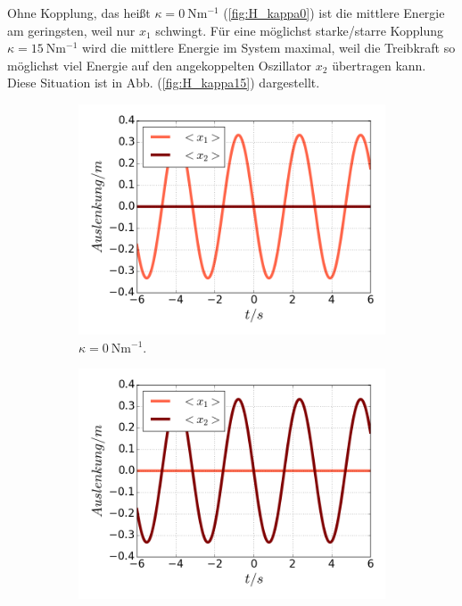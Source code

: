 \fi
    Ohne Kopplung, das heißt $\kappa=\SI{0}{\newton \meter^{-1}}$ (\ref{fig:H_kappa0}) ist die mittlere Energie am geringsten, weil nur $x_1$ schwingt.
    Für eine möglichst starke/starre Kopplung $\kappa=\SI{15}{\newton \meter^{-1}}$ wird die mittlere Energie im System maximal, weil die Treibkraft so möglichst viel Energie auf den angekoppelten Oszillator $x_2$ übertragen kann.
    Diese Situation ist in Abb. (\ref{fig:H_kappa15}) dargestellt.
    \begin{figure}
      \begin{subfigure}[t]{0.5\textwidth}
        \centering
        \includegraphics[width=\textwidth]{plots/<x2>nl0.png}
        \caption{$\kappa=\SI{0}{\newton \meter^{-1}}$.}
        \label{fig:x2_null}
      \end{subfigure}
      \begin{subfigure}[t]{0.5\textwidth}
          \centering
          \includegraphics[width=\textwidth]{plots/<x1>nl0.png}

\end{subfigure}
\end{figure}

